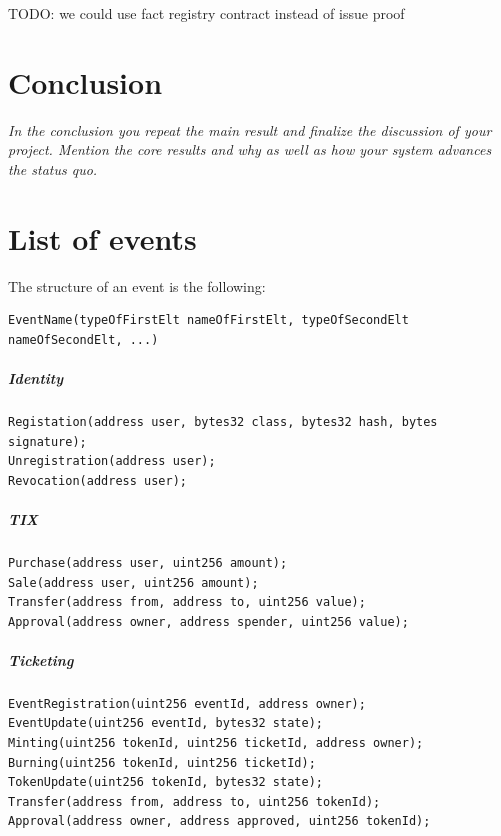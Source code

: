 \documentclass[a4paper,11pt,oneside]{report}
\begin{document}
TODO: we could use fact registry contract instead of issue proof

\chapter{Conclusion}

\textit{In the conclusion you repeat the main result and finalize the discussion of
your project. Mention the core results and why as well as how your system
advances the status quo.} \\

\cleardoublepage
{}
{}
\nocite{*}
\printbibliography

\appendix
\chapter{List of events}
\label{sec:appendix_a}

The structure of an event is the following: 
\begin{verbatim}
EventName(typeOfFirstElt nameOfFirstElt, typeOfSecondElt nameOfSecondElt, ...)
\end{verbatim}



\paragraph{Identity}
\begin{verbatim}
Registation(address user, bytes32 class, bytes32 hash, bytes signature);
Unregistration(address user);
Revocation(address user);
\end{verbatim}

\paragraph{TIX}
\begin{verbatim}
Purchase(address user, uint256 amount);
Sale(address user, uint256 amount);
Transfer(address from, address to, uint256 value);
Approval(address owner, address spender, uint256 value);
\end{verbatim}

\paragraph{Ticketing}
\begin{verbatim}
EventRegistration(uint256 eventId, address owner);
EventUpdate(uint256 eventId, bytes32 state);
Minting(uint256 tokenId, uint256 ticketId, address owner);
Burning(uint256 tokenId, uint256 ticketId);
TokenUpdate(uint256 tokenId, bytes32 state);
Transfer(address from, address to, uint256 tokenId);
Approval(address owner, address approved, uint256 tokenId);
\end{verbatim}
\end{document}

